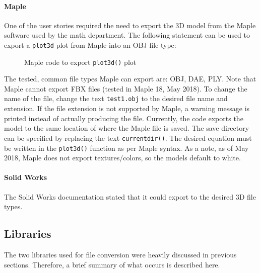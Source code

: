             \paragraph{Maple}

                One of the user stories required the need to export the 3D model from the Maple software used by the math department.  The following statement can be used to export a \texttt{plot3d} plot from Maple into an OBJ file type:

                \noindent\makebox[\linewidth]{\rule{\textwidth}{0.4pt}}

                \begin{figure}[H]
                    
                    \caption{Maple code to export \texttt{plot3d()} plot}
                \end{figure}

                \noindent\makebox[\linewidth]{\rule{\textwidth}{0.4pt}}                

                The tested, common file types Maple can export are: OBJ, DAE, PLY.  Note that Maple cannot export FBX files (tested in Maple 18, May 2018).  To change the name of the file, change the text \texttt{test1.obj} to the desired file name and extension.  If the file extension is not supported by Maple, a warning message is printed instead of actually producing the file.  Currently, the code exports the model to the same location of where the Maple file is saved.  The save directory can be specified by replacing the text \texttt{currentdir()}.  The desired equation must be written in the \texttt{plot3d()} function as per Maple syntax.  As a note, as of May 2018, Maple does not export textures/colors, so the models default to white.

            \paragraph{Solid Works}
                
            The Solid Works documentation stated that it could export to the desired 3D file types.

    \subsection{Libraries}

        The two libraries used for file conversion were heavily discussed in previous sections.  Therefore, a brief summary of what occurs is described here.


